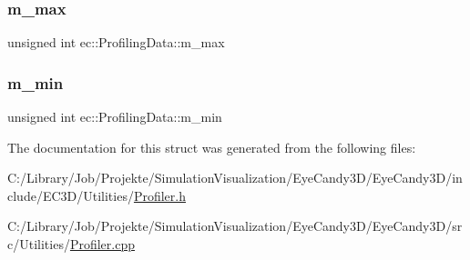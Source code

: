 \subsubsection{\texorpdfstring{m\+\_\+max}{m\_max}}
{\footnotesize\ttfamily unsigned int ec\+::\+Profiling\+Data\+::m\+\_\+max}

\mbox{\label{structec_1_1_profiling_data_a2dd2e0b50fb962c7b067906f60542dd5}} 
\subsubsection{\texorpdfstring{m\+\_\+min}{m\_min}}
{\footnotesize\ttfamily unsigned int ec\+::\+Profiling\+Data\+::m\+\_\+min}



The documentation for this struct was generated from the following files\+:\begin{DoxyCompactItemize}
\item 
C\+:/\+Library/\+Job/\+Projekte/\+Simulation\+Visualization/\+Eye\+Candy3\+D/\+Eye\+Candy3\+D/include/\+E\+C3\+D/\+Utilities/\mbox{\hyperlink{_profiler_8h}{Profiler.\+h}}\item 
C\+:/\+Library/\+Job/\+Projekte/\+Simulation\+Visualization/\+Eye\+Candy3\+D/\+Eye\+Candy3\+D/src/\+Utilities/\mbox{\hyperlink{_profiler_8cpp}{Profiler.\+cpp}}\end{DoxyCompactItemize}
